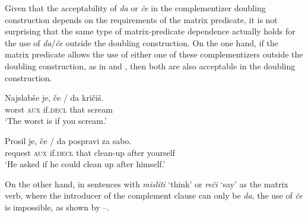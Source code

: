 \documentclass[output=paper,
]{langscibook}
\begin{document}
\noindent Given that the acceptability of \textit{da} or \textit{če} in the complementizer doubling construction depends on the requirements of the matrix predicate, it is not surprising that the same type of matrix-predicate dependence actually holds for the use of \textit{da}/\textit{če} outside the doubling construction. On the one hand, if the matrix predicate allows the use of either one of these complementizers outside the doubling construction, as in  and , then both are also acceptable in the doubling construction. 

\begin{exe} 
\ex \label{ex:plesnicar:twentyfive}
\gll Najslabše 	je, 	če / \hspace{-2pt} da 		kričiš.\\
  worst		\textsc{aux}	if.\textsc{decl} {} {} that	scream\\
\trans `The worst is if you scream.'
\end{exe}


\begin{exe} 
\ex \label{ex:plesnicar:twentysix}
\gll Prosil 		je, 	če / \hspace{-2pt} da 		pospravi 	za 	sabo.\\
 request		\textsc{aux}	if.\textsc{decl} {} {} that	clean-up 	after	yourself \\
\trans `He asked if he could clean up after himself.'
\end{exe}

\noindent On the other hand, in sentences with \textit{misliti} `think' or \textit{reči} `say' as the matrix verb, where the introducer of the complement clause can only be \textit{da}, the use of \textit{če} is impossible, as shown by --. 

\begin{exe} 
\end{exe}


\begin{exe} 
\end{exe}
\end{document}
